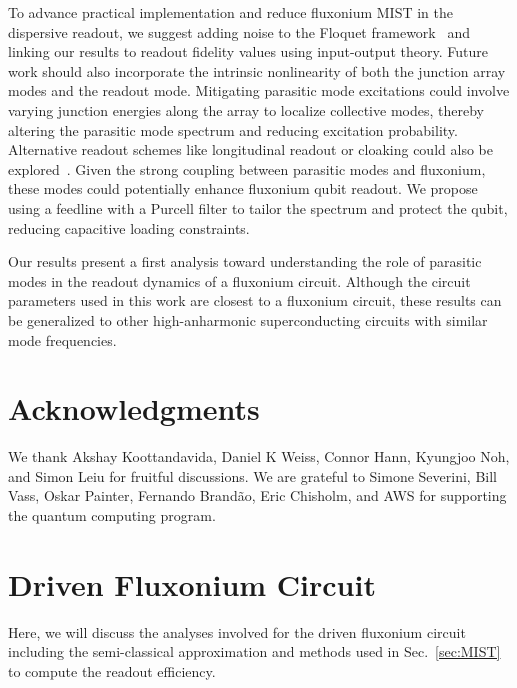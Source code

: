 \documentclass[%
reprint,
superscriptaddress,
 amsmath,amssymb,
 aps,
 prx,
longbibliography,
floatfix,
]{revtex4-2}
\begin{document}
To advance practical implementation and reduce fluxonium MIST in the dispersive readout, we suggest adding noise to the Floquet framework~\cite{huang_engineering_2021} and linking our results to readout fidelity values using input-output theory. Future work should also incorporate the intrinsic nonlinearity of both the junction array modes and the readout mode. Mitigating parasitic mode excitations could involve varying junction energies along the array to localize collective modes, thereby altering the parasitic mode spectrum and reducing excitation probability. Alternative readout schemes like longitudinal readout or cloaking could also be explored~\cite{reed_high-fidelity_2010, munoz-arias_qubit_2023, didier_fast_2015}. Given the strong coupling between parasitic modes and fluxonium, these modes could potentially enhance fluxonium qubit readout. We propose using a feedline with a Purcell filter to tailor the spectrum and protect the qubit, reducing capacitive loading constraints.


Our results present a first analysis toward understanding the role of parasitic modes in the readout dynamics of a fluxonium circuit. Although the circuit parameters used in this work are closest to a fluxonium circuit, these results can be generalized to other high-anharmonic superconducting circuits with similar mode frequencies.

\section{Acknowledgments}
 We thank Akshay Koottandavida, Daniel K Weiss, Connor Hann, Kyungjoo Noh, and Simon Leiu for fruitful discussions. We are grateful to Simone Severini, Bill Vass, Oskar Painter, Fernando Brand\~ao, Eric Chisholm, and AWS for supporting the quantum computing program. %
\appendix
\section{Driven Fluxonium Circuit}\label{app:MIST}
Here, we will discuss the analyses involved for the driven fluxonium circuit including the semi-classical approximation and methods used in Sec.~\ref{sec:MIST} to compute the readout efficiency. 
\end{document}
